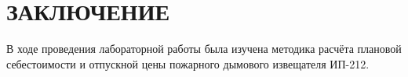 \section*{ЗАКЛЮЧЕНИЕ}

В ходе проведения лабораторной работы была изучена методика расчёта
плановой себестоимости и отпускной цены пожарного дымового извещателя ИП-212.

\newpage
